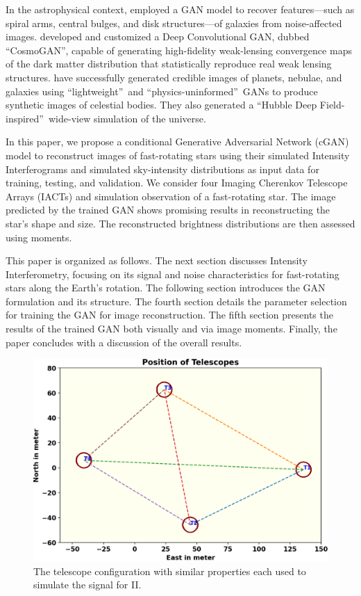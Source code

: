 In the astrophysical context, \cite{schawinski2017galaxypics} employed a GAN model to recover features—such as spiral arms, central bulges, and disk structures—of galaxies from noise-affected images. \cite{mustafa2019cosmogan} developed and customized a Deep Convolutional GAN, dubbed \textquotedblleft CosmoGAN\textquotedblright, capable of generating high-fidelity weak-lensing convergence maps of the dark matter distribution that statistically reproduce real weak lensing structures. \cite{coccomini2021lightweightgan} have successfully generated credible images of planets, nebulae, and galaxies using \textquotedblleft lightweight\textquotedblright\ and \textquotedblleft physics-uninformed\textquotedblright\ GANs to produce synthetic images of celestial bodies. They also generated a \textquotedblleft Hubble Deep Field-inspired\textquotedblright\ wide-view simulation of the universe. 

In this paper, we propose a conditional Generative Adversarial Network (cGAN) model \citep[following][]{isola2017image} to reconstruct images of fast-rotating stars using their simulated Intensity Interferograms and simulated sky-intensity distributions as input data for training, testing, and validation. We consider four Imaging Cherenkov Telescope Arrays (IACTs) and simulation observation of a fast-rotating star. The image predicted by the trained GAN shows promising results in reconstructing the star’s shape and size. The reconstructed brightness distributions are then assessed using moments.

This paper is organized as follows. The next section discusses Intensity Interferometry, focusing on its signal and noise characteristics for fast-rotating stars along the Earth’s rotation. The following section introduces the GAN formulation and its structure. The fourth section details the parameter selection for training the GAN for image reconstruction. The fifth section presents the results of the trained GAN both visually and via image moments. Finally, the paper concludes with a discussion of the overall results.
\begin{figure}
	\centering
	\includegraphics[width=\linewidth]{fig/telescope.png}
	\caption{The telescope configuration with similar properties each used to simulate the signal for II.}
	\label{fig:teles}
\end{figure}